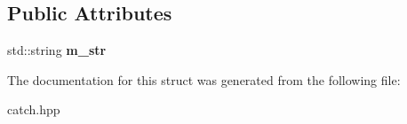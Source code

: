 \subsection*{Public Attributes}
\begin{DoxyCompactItemize}
\item 
\hypertarget{structCatch_1_1Matchers_1_1Impl_1_1StdString_1_1Equals_a41fc4413185f47d8b6d8da7a55078921}{
std::string {\bfseries m\_\-str}}
\label{structCatch_1_1Matchers_1_1Impl_1_1StdString_1_1Equals_a41fc4413185f47d8b6d8da7a55078921}

\end{DoxyCompactItemize}


The documentation for this struct was generated from the following file:\begin{DoxyCompactItemize}
\item 
catch.hpp\end{DoxyCompactItemize}
